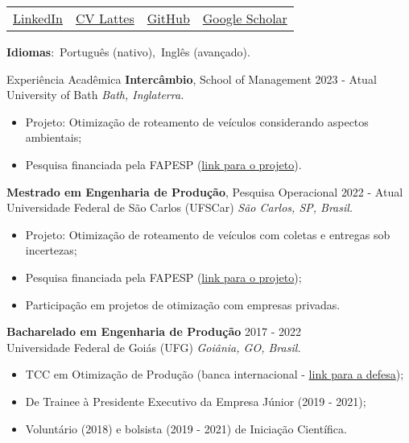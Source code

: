 \documentclass{resume} %
\begin{document}
\begin{tabularx}{\textwidth}{YYYY}
    \href{https://www.linkedin.com/in/abreu-alex/}{LinkedIn} & 
    \href{http://lattes.cnpq.br/0273240076049563}{CV Lattes} &
    \href{https://github.com/abreualexp}{GitHub} &
    \href{https://scholar.google.com/citations?user=IuZ2wVQAAAAJ\&hl}{Google Scholar}
\end{tabularx}

\textbf{Idiomas}:\
    Português (nativo),\
    Inglês (avançado).

\begin{rSection}{Experiência Acadêmica}
{\bf Intercâmbio}, School of Management \hfill {2023 - Atual}\\
University of Bath \hfill \textit{Bath, Inglaterra.}
\begin{itemize}
\itemsep -8pt {}
    \item Projeto: Otimização de roteamento de veículos considerando aspectos ambientais;
    \item Pesquisa financiada pela FAPESP (\href{https://bv.fapesp.br/pt/bolsas/211223/}{link para o projeto}).
\end{itemize}

{\bf Mestrado em Engenharia de Produção}, Pesquisa Operacional \hfill {2022 - Atual}\\
Universidade Federal de São Carlos (UFSCar) \hfill \textit{São Carlos, SP, Brasil.}
\begin{itemize}
\itemsep -8pt {}
    \item Projeto: Otimização de roteamento de veículos com coletas e entregas sob incertezas;
    \item Pesquisa financiada pela FAPESP (\href{https://bv.fapesp.br/pt/bolsas/205661/}{link para o projeto});
    \item Participação em projetos de otimização com empresas privadas.
\end{itemize}

{\bf Bacharelado em Engenharia de Produção} \hfill {2017 - 2022}\\
Universidade Federal de Goiás (UFG) \hfill \textit{Goiânia, GO, Brasil.}
\begin{itemize}
\itemsep -8pt {}
    \item TCC em Otimização de Produção (banca internacional - \href{https://youtu.be/BdtktfRTIfk}{link para a defesa});
    \item De Trainee à Presidente Executivo da Empresa Júnior (2019 - 2021);
    \item Voluntário (2018) e bolsista (2019 - 2021) de Iniciação Científica.
\end{itemize}

\end{rSection}
\end{document}
